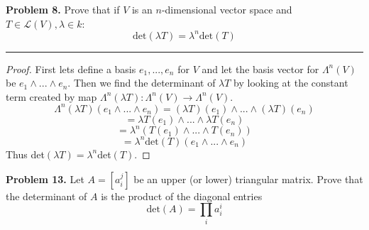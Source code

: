 \documentclass[leqno]{article}
\theoremstyle{nonumberplain}
\newtheorem{proof}{Proof}
\begin{document}

\noindent \textbf{Problem 8.} Prove that if $V$ is an $n$-dimensional vector space and $T \in \mathcal{L}(V), \lambda \in k$:
\[
\textrm{det}(\lambda T) = \lambda^n \textrm{det}(T)
\]

\noindent\rule[0.5ex]{\linewidth}{1pt}
\begin{proof}
First lets define a basis $e_1,...,e_n$ for $V$ and let the basis vector for $\Lambda^n(V)$ be $e_1 \wedge ... \wedge e_n$.  Then we find the determinant of $\lambda T$ by looking at the constant term created by map $\Lambda^n(\lambda T):\Lambda^n(V) \rightarrow \Lambda^n(V)$.  
\[
\Lambda^n(\lambda T)(e_1 \wedge ... \wedge e_n) = (\lambda T)(e_1) \wedge ... \wedge (\lambda T)(e_n)
\]
\[
=\lambda T(e_1) \wedge ... \wedge \lambda T(e_n)
\]
\[
=\lambda^n (T(e_1) \wedge ... \wedge T(e_n))
\]
\[
=\lambda^n \textrm{det}(T) (e_1 \wedge ... \wedge e_n)
\]
Thus det$(\lambda T)=\lambda^n$det$(T)$.
\end{proof}
\pagebreak

\noindent\textbf{Problem 13.} Let $A=[a_i^j]$ be an upper (or lower) triangular matrix.  Prove that the determinant of $A$ is the product of the diagonal entries
\[
\textrm{det}(A)=\prod_i a_i^i
\]
\end{document}
